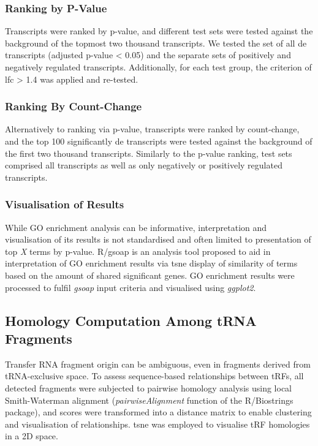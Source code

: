 \begin{method}
\subsubsection{Ranking by P-Value}
Transcripts were ranked by p-value, and different test sets were tested against the background of the topmost two thousand transcripts. We tested the set of all \ac{de} transcripts (adjusted p-value < 0.05) and the separate sets of positively and negatively regulated transcripts. Additionally, for each test group, the criterion of \ac{lfc} > 1.4 was applied and re-tested.

\subsubsection{Ranking By Count-Change}
Alternatively to ranking via p-value, transcripts were ranked by count-change, and the top 100 significantly \ac{de} transcripts were tested against the background of the first two thousand transcripts. Similarly to the p-value ranking, test sets comprised all transcripts as well as only negatively or positively regulated transcripts.

\subsubsection{Visualisation of Results}
While GO enrichment analysis can be informative, interpretation and visualisation of its results is not standardised and often limited to presentation of top \emph{X} terms by p-value. R/gsoap\cite{Tokar2020} is an analysis tool proposed to aid in interpretation of GO enrichment results via \acf{tsne} display of similarity of terms based on the amount of shared significant genes. GO enrichment results were processed to fulfil \emph{gsoap} input criteria and visualised using \emph{ggplot2}.\cite{Wickham2016}

\subsection{Homology Computation Among tRNA Fragments}
Transfer RNA fragment origin can be ambiguous, even in fragments derived from tRNA-exclusive space. To assess sequence-based relationships between tRFs, all detected fragments were subjected to pairwise homology analysis using local Smith-Waterman alignment (\emph{pairwiseAlignment} function of the R/Biostrings package), and scores were transformed into a distance matrix to enable clustering and visualisation of relationships. \ac{tsne} was employed to visualise tRF homologies in a 2D space.


\end{method}
